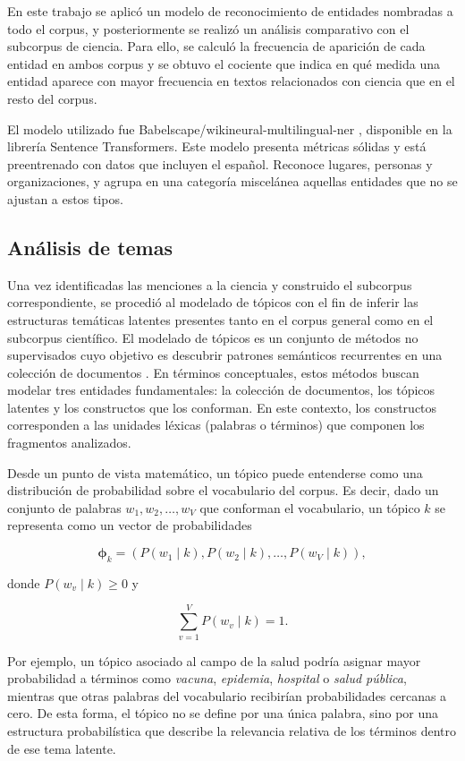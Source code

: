 \documentclass[11pt,a4paper]{article}
\begin{document}
	En este trabajo se aplicó un modelo de reconocimiento de entidades nombradas a todo el corpus, y posteriormente se realizó un análisis comparativo con el subcorpus de ciencia. Para ello, se calculó la frecuencia de aparición de cada entidad en ambos corpus y se obtuvo el cociente que indica en qué medida una entidad aparece con mayor frecuencia en textos relacionados con ciencia que en el resto del corpus.
	
	El modelo utilizado fue Babelscape/wikineural-multilingual-ner \cite{tedeschi-etal-2021-wikineural-combined}, disponible en la librería Sentence Transformers. Este modelo presenta métricas sólidas y está preentrenado con datos que incluyen el español. Reconoce lugares, personas y organizaciones, y agrupa en una categoría miscelánea aquellas entidades que no se ajustan a estos tipos.
	
	\subsection{Análisis de temas}\label{sec:topic_model}
	
	
	Una vez identificadas las menciones a la ciencia y construido el subcorpus correspondiente, se procedió al modelado de tópicos con el fin de inferir las estructuras temáticas latentes presentes tanto en el corpus general como en el subcorpus científico. El modelado de tópicos es un conjunto de métodos no supervisados cuyo objetivo es descubrir patrones semánticos recurrentes en una colección de documentos \cite{Abdelrazek2023}. En términos conceptuales, estos métodos buscan modelar tres entidades fundamentales: la colección de documentos, los tópicos latentes y los constructos que los conforman. En este contexto, los constructos corresponden a las unidades léxicas (palabras o términos) que componen los fragmentos analizados.
	
	Desde un punto de vista matemático, un tópico puede entenderse como una distribución de probabilidad sobre el vocabulario del corpus. Es decir, dado un conjunto de palabras $w_1, w_2, \dots, w_V$ que conforman el vocabulario, un tópico $k$ se representa como un vector de probabilidades
	
	\[
	\boldsymbol{\phi}_k = \left( P(w_1 \mid k), P(w_2 \mid k), \dots, P(w_V \mid k) \right),
	\]
	
	donde $P(w_v \mid k) \ge 0$ y
	
	\[
	\sum_{v=1}^{V} P(w_v \mid k) = 1.
	\]
	
	Por ejemplo, un tópico asociado al campo de la salud podría asignar mayor probabilidad a términos como \emph{vacuna}, \emph{epidemia}, \emph{hospital} o \emph{salud pública}, mientras que otras palabras del vocabulario recibirían probabilidades cercanas a cero. De esta forma, el tópico no se define por una única palabra, sino por una estructura probabilística que describe la relevancia relativa de los términos dentro de ese tema latente.
	
\end{document}
